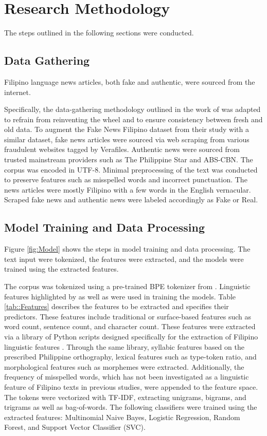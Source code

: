 \chapter{Research Methodology}

The steps outlined in the following sections were conducted.

\section{Data Gathering}

Filipino language news articles, both fake and authentic, were sourced from the internet.

Specifically, the data-gathering methodology outlined in the work of \cite{cruz2020localization} was adapted to refrain from reinventing the wheel and to ensure consistency between fresh and old data. To augment the Fake News Filipino dataset from their study with a similar dataset, fake news articles were sourced via web scraping from various fraudulent websites tagged by Verafiles. Authentic news were sourced from trusted mainstream providers such as The Philippine Star and ABS-CBN. The corpus was encoded in UTF-8. Minimal preprocessing of the text was conducted to preserve features such as misspelled words and incorrect punctuation. The news articles were mostly Filipino with a few words in the English vernacular. Scraped fake news and authentic news were labeled accordingly as Fake or Real.

\section{Model Training and Data Processing}
\label{sec:ModelTraining}

Figure \ref{fig:Model} shows the steps in model training and data processing. The text input were tokenized, the features were extracted, and the models were trained using the extracted features.

The corpus was tokenized using a pre-trained BPE tokenizer from . Linguistic features highlighted by  as well as  were used in training the models. Table \ref{tab::Features} describes the features to be extracted and specifies their predictors. These features include traditional or surface-based  features such as word count, sentence count, and character count. These features were extracted via a library of Python scripts designed specifically for the extraction of Filipino linguistic features \cite{imperial-2020, imperial-2021}. Through the same library, syllabic features based on the prescribed Philippine orthography, lexical features such as type-token ratio, and morphological features such as morphemes were extracted. Additionally, the frequency of misspelled words, which has not been investigated as a linguistic feature of Filipino texts in previous studies, were appended to the feature space. The tokens were vectorized with TF-IDF, extracting unigrams, bigrams, and trigrams as well as bag-of-words. The following classifiers were trained using the extracted features: Multinomial Naive Bayes, Logistic Regression, Random Forest, and Support Vector Classifier (SVC).

